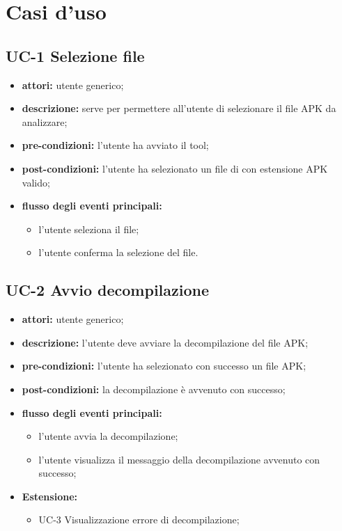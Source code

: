 \section{Casi d'uso}\label{sec:casi-d'uso}
\subsection*{UC-1 Selezione file}\label{subsec:uc-1-selezione-file}
\begin{itemize}
    \item \textbf{attori:} utente generico;
    \item \textbf{descrizione:} serve per permettere all'utente di selezionare il file APK da analizzare;
    \item \textbf{pre-condizioni:} l'utente ha avviato il tool;
    \item \textbf{post-condizioni:} l'utente ha selezionato un file di con estensione APK valido;
    \item \textbf{flusso degli eventi principali:}
    \begin{itemize}
        \item l'utente seleziona il file;
        \item l'utente conferma la selezione del file.
    \end{itemize}
\end{itemize}
\subsection*{UC-2 Avvio decompilazione}\label{subsec:uc-2-avvio-decompilazione}
\begin{itemize}
    \item \textbf{attori:} utente generico;
    \item \textbf{descrizione:} l'utente deve avviare la decompilazione del file APK;
    \item \textbf{pre-condizioni:} l'utente ha selezionato con successo un file APK;
    \item \textbf{post-condizioni:} la decompilazione è avvenuto con successo;
    \item \textbf{flusso degli eventi principali:}
    \begin{itemize}
        \item l'utente avvia la decompilazione;
        \item l'utente visualizza il messaggio della decompilazione avvenuto con successo;
    \end{itemize}
    \item \textbf{Estensione:}
    \begin{itemize}
        \item UC-3 Visualizzazione errore di decompilazione;
    \end{itemize}
\end{itemize}


